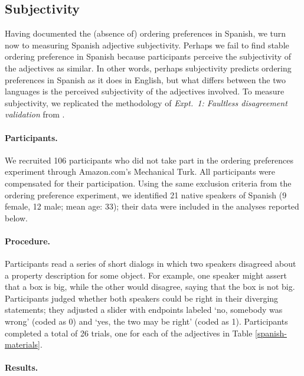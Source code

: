 \documentclass[12pt,letterpaper]{article}
\begin{document}
\subsection{Subjectivity} 

Having documented the (absence of) ordering preferences in Spanish, we turn now to measuring Spanish adjective subjectivity. Perhaps we fail to find stable ordering preference in Spanish because participants perceive the subjectivity of the adjectives as similar. In other words, perhaps subjectivity predicts ordering preferences in Spanish as it does in English, but what differs between the two languages is the perceived subjectivity of the adjectives involved. To measure subjectivity, we replicated the methodology of \emph{Expt.~1: Faultless disagreement validation} from \cite{scontrasetal2017adjectives}. 

\paragraph{Participants.}

We recruited 106 participants who did not take part in the ordering preferences experiment through Amazon.com's Mechanical Turk. All participants were compensated for their participation. Using the same exclusion criteria from the ordering preference experiment, we identified 21 native speakers of Spanish (9 female, 12 male; mean age: 33); their data were included in the analyses reported below.


\paragraph{Procedure.}

Participants read a series of short dialogs in which two speakers disagreed about a property description for some object. For example, one speaker might assert that a box is big, while the other would disagree, saying that the box is not big. Participants judged whether both speakers could be right in their diverging statements; they adjusted a slider with endpoints labeled `no, somebody was wrong' (coded as 0) and `yes, the two may be right' (coded as 1). Participants completed a total of 26 trials, one for each of the adjectives in Table \ref{spanish-materials}.

\paragraph{Results.}
\end{document}

